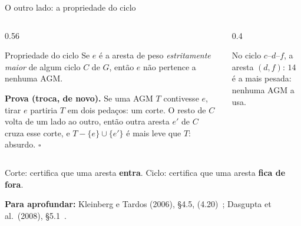 \documentclass[aspectratio=169,xcolor=table]{beamer}
\newcommand{\arestasclrs}{a/b/4, a/h/8, b/c/8, b/h/11, c/d/7, c/f/4, c/i/2,
  d/e/9, d/f/14, e/f/10, f/g/2, g/h/1, g/i/6, h/i/7}
\newcommand{\grafoclrs}[3]{%
  \coordinate (a) at (0,0);     \coordinate (b) at (1,1);
  \coordinate (c) at (2.3,1);   \coordinate (d) at (3.6,1);
  \coordinate (e) at (4.6,0);   \coordinate (f) at (3.6,-1);
  \coordinate (g) at (2.3,-1);  \coordinate (h) at (1,-1);
  \coordinate (i) at (1.75,0);
  \foreach \u/\v/\w in \arestasclrs \draw[aresta] (\u) -- (\v);
  \def\lista{#1}\ifx\lista\empty\else
    \foreach \u/\v in {#1} \draw[arvore] (\u) -- (\v);\fi
  \def\lista{#3}\ifx\lista\empty\else
    \foreach \u/\v in {#3} \draw[rejeitada] (\u) -- (\v);\fi
  \foreach \u/\v/\w in \arestasclrs \path (\u) -- (\v) node[peso, pos=0.5] {\w};
  \foreach \v in {a,...,i} \node[vert] at (\v) {\v};
  \def\lista{#2}\ifx\lista\empty\else
    \foreach \v in {#2} \node[vdentro] at (\v) {\v};\fi
}
\newcommand{\fonte}[1]{%
  \vfill
  {\tiny\color{gray!55!black}\textbf{Para aprofundar:} #1\par}%
}
\begin{document}
\begin{frame}{O outro lado: a propriedade do ciclo}
  \begin{columns}[c]
    \begin{column}{0.56\textwidth}
      \begin{block}{Propriedade do ciclo}
        \small Se $e$ é a aresta de peso \emph{estritamente maior} de algum ciclo $C$ de $G$,
        então $e$ não pertence a nenhuma AGM.
      \end{block}
      \scriptsize
      \textbf{Prova (troca, de novo).} Se uma AGM $T$ contivesse $e$, tirar $e$ partiria $T$
      em dois pedaços: um corte. O resto de $C$ volta de um lado ao outro, então
      outra aresta $e'$ de $C$ cruza esse corte, e $T - \{e\} \cup \{e'\}$ é mais leve que
      $T$: absurdo. \hfill$\square$
    \end{column}
    \begin{column}{0.4\textwidth}
      \begin{center}
      \end{center}
      \scriptsize No ciclo $c\text{--}d\text{--}f$, a aresta $(d,f){:}\,14$ é a mais pesada:
      nenhuma AGM a usa.
    \end{column}
  \end{columns}
  \medskip
  {\scriptsize Corte: certifica que uma aresta \textbf{entra}. Ciclo: certifica que uma aresta
  \textbf{fica de fora}.\par}
  \fonte{Kleinberg e Tardos (2006), \S 4.5, (4.20)~\cite{kleinberg2006algorithm};
    Dasgupta et al.\ (2008), \S 5.1~\cite{dasgupta2008algorithms}.}
\end{frame}
\end{document}
